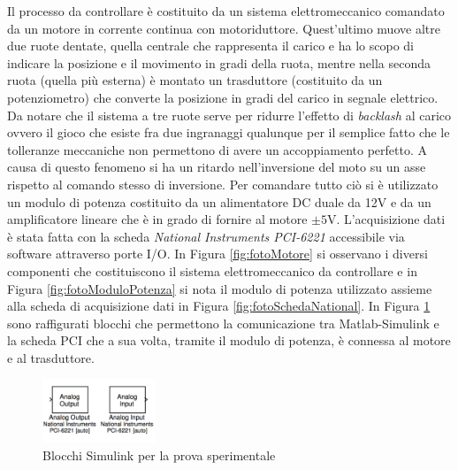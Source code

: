 	\noindent Il processo da controllare è costituito da un sistema elettromeccanico comandato da un motore in corrente continua con motoriduttore. Quest'ultimo muove altre due ruote dentate, quella centrale che rappresenta il carico e ha lo scopo di indicare la posizione e il movimento in gradi della ruota, mentre nella seconda ruota (quella più esterna) è montato un trasduttore (costituito da un potenziometro) che converte la posizione in gradi del carico in segnale elettrico. Da notare che il sistema a tre ruote serve per ridurre l'effetto di \textit{backlash} al carico ovvero il gioco che esiste fra due ingranaggi qualunque per il semplice fatto che le tolleranze meccaniche non permettono di avere un accoppiamento perfetto. A causa di questo fenomeno si ha un ritardo nell'inversione del moto su un asse rispetto al comando stesso di inversione. Per comandare tutto ciò si è utilizzato un modulo di potenza costituito da un alimentatore DC duale da 12V e da un amplificatore lineare che è in grado di fornire al motore $\pm 5$V. L'acquisizione dati è stata fatta con la scheda \textit{National Instruments PCI-6221} accessibile via software attraverso porte I/O. In Figura \ref{fig:fotoMotore} si osservano i diversi componenti che costituiscono il sistema elettromeccanico da controllare e in Figura \ref{fig:fotoModuloPotenza} si nota il modulo di potenza utilizzato assieme alla scheda di acquisizione dati in Figura \ref{fig:fotoSchedaNational}. In Figura \ref{fig:blocchiSimulink} sono raffigurati blocchi che permettono la comunicazione tra Matlab-Simulink e la scheda PCI che a sua volta, tramite il modulo di potenza, è connessa al motore e al trasduttore.
	
	\begin{figure}[!h]
		\centering
		\includegraphics[width=0.3\textwidth]{./figure/blocchi_simulink}
		\caption{Blocchi Simulink per la prova sperimentale}
		\label{fig:blocchiSimulink}
	\end{figure}